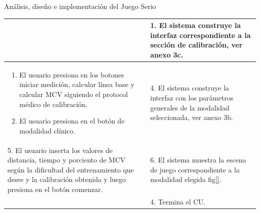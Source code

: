 \begin{thesischapter}{2} {Análisis, diseño e implementación del Juego Serio}
\begin{center}
\begin{table}
\begin{tabularx}{\textwidth}{|X|X|}
                & 
                1. El sistema construye la interfaz correspondiente a la sección de calibración, ver anexo 3c. \\\hline
                \begin{enumerate}
                    \item[2.] El usuario presiona en los botones iniciar medición, calcular línea base y calcular MCV siguiendo el protocol médico de calibración.
                    \item[3.] El usuario presiona en el botón de modalidad clínico.
                \end{enumerate}
                &
                4. El sistema construye la interfaz con los parámetros generales de la modalidad seleccionada, ver anexo 3b. \\\hline
                5. El usuario inserta los valores de distancia, tiempo y porciento de MCV según la dificultad del entrenamiento que desee y la calibración obtenida y luego presiona en el botón comenzar. 
                & 
                6. El sistema muestra la escena de juego correspondiente a la modalidad elegida fig\ref{}. \\ &4. Termina el CU. \\\hline
                

                
                



\end{tabularx}
\end{table}
\end{center}
\end{thesischapter}
